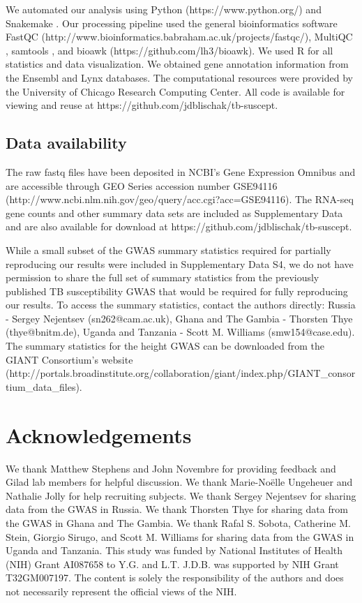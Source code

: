 \documentclass[fleqn,10pt]{wlscirep}
\begin{document}
We automated our analysis using Python (https://www.python.org/) and
Snakemake \cite{Koster2012}. Our processing pipeline used the general
bioinformatics software FastQC
(http://www.bioinformatics.babraham.ac.uk/projects/fastqc/), MultiQC
\cite{Ewels2016}, samtools \cite{Li2009}, and bioawk
(https://github.com/lh3/bioawk). We used R \cite{R2015} for all
statistics and data visualization. We obtained gene annotation
information from the Ensembl \cite{Yates2016} and Lynx
\cite{Sulakhe2016} databases. The computational resources were
provided by the University of Chicago Research Computing Center. All
code is available for viewing and reuse at
https://github.com/jdblischak/tb-suscept.
\subsection*{Data availability}

The raw fastq files have been deposited in NCBI's Gene Expression
Omnibus \cite{Edgar2002} and are accessible through GEO Series
accession number GSE94116
(http://www.ncbi.nlm.nih.gov/geo/query/acc.cgi?acc=GSE94116). The
RNA-seq gene counts and other summary data sets are included as
Supplementary Data and are also available for download at
https://github.com/jdblischak/tb-suscept.

While a small subset of the GWAS summary statistics required for
partially reproducing our results were included in Supplementary Data
S4, we do not have permission to share the full set of summary
statistics from the previously published TB susceptibility GWAS that
would be required for fully reproducing our results. To access the
summary statistics, contact the authors directly: Russia - Sergey
Nejentsev (sn262@cam.ac.uk), Ghana and The Gambia - Thorsten Thye
(thye@bnitm.de), Uganda and Tanzania - Scott M. Williams
(smw154@case.edu). The summary statistics for the height GWAS can be
downloaded from the GIANT Consortium’s website
(http://portals.broadinstitute.org/collaboration/giant/index.php/GIANT\_consortium\_data\_files).
\section*{Acknowledgements}

We thank Matthew Stephens and John Novembre for providing feedback and
Gilad lab members for helpful discussion. We thank Marie-Noëlle
Ungeheuer and Nathalie Jolly for help recruiting subjects. We thank
Sergey Nejentsev for sharing data from the GWAS in Russia. We thank
Thorsten Thye for sharing data from the GWAS in Ghana and The Gambia.
We thank Rafal S. Sobota, Catherine M. Stein, Giorgio Sirugo, and
Scott M. Williams for sharing data from the GWAS in Uganda and
Tanzania. This study was funded by National Institutes of Health (NIH)
Grant AI087658 to Y.G. and L.T. J.D.B. was supported by NIH Grant
T32GM007197. The content is solely the responsibility of the authors
and does not necessarily represent the official views of the NIH.
\end{document}
